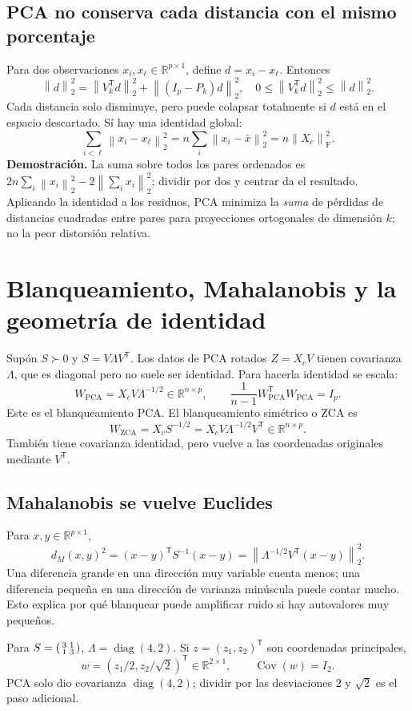 \documentclass[11pt,a4paper]{article}
\newcommand{\R}{\mathbb R}
\newcommand{\T}{^{\mathsf T}}
\newcommand{\norm}[1]{\left\lVert #1\right\rVert}
\DeclareMathOperator{\Cov}{Cov}
\DeclareMathOperator{\diag}{diag}
\newcommand{\F}{_{\mathrm F}}
\theoremstyle{definition}
\begin{document}
\subsection{PCA no conserva cada distancia con el mismo porcentaje}
Para dos observaciones $x_i,x_\ell\in\R^{p\times1}$, define $d=x_i-x_\ell$. Entonces
\[
\norm d_2^2=\norm{V_k\T d}_2^2+\norm{(I_p-P_k)d}_2^2,
\quad 0\le\norm{V_k\T d}_2^2\le\norm d_2^2.
\]
Cada distancia solo disminuye, pero puede colapsar totalmente si $d$ está en el espacio descartado. Sí hay una identidad global:
\[
\sum_{i<\ell}\norm{x_i-x_\ell}_2^2=n\sum_i\norm{x_i-\bar x}_2^2=n\norm{X_c}\F^2.
\]
\textbf{Demostración.} La suma sobre todos los pares ordenados es $2n\sum_i\norm{x_i}_2^2-2\norm{\sum_ix_i}_2^2$; dividir por dos y centrar da el resultado. Aplicando la identidad a los residuos, PCA minimiza la \emph{suma} de pérdidas de distancias cuadradas entre pares para proyecciones ortogonales de dimensión $k$; no la peor distorsión relativa.

\section{Blanqueamiento, Mahalanobis y la geometría de identidad}
Supón $S\succ0$ y $S=V\Lambda V\T$. Los datos de PCA rotados $Z=X_cV$ tienen covarianza $\Lambda$, que es diagonal pero no suele ser identidad. Para hacerla identidad se escala:
\[
W_{\mathrm{PCA}}=X_cV\Lambda^{-1/2}\in\R^{n\times p},\qquad
\frac1{n-1}W_{\mathrm{PCA}}\T W_{\mathrm{PCA}}=I_p.
\]
Este es el blanqueamiento PCA. El blanqueamiento simétrico o ZCA es
\[
W_{\mathrm{ZCA}}=X_cS^{-1/2}=X_cV\Lambda^{-1/2}V\T\in\R^{n\times p}.
\]
También tiene covarianza identidad, pero vuelve a las coordenadas originales mediante $V\T$.
\subsection{Mahalanobis se vuelve Euclides}
Para $x,y\in\R^{p\times1}$,
\[
d_M(x,y)^2=(x-y)\T S^{-1}(x-y)
=\norm{\Lambda^{-1/2}V\T(x-y)}_2^2.
\]
Una diferencia grande en una dirección muy variable cuenta menos; una diferencia pequeña en una dirección de varianza minúscula puede contar mucho. Esto explica por qué blanquear puede amplificar ruido si hay autovalores muy pequeños.
\begin{ejemplo}
Para $S=\begin{psmallmatrix}3&1\\1&3\end{psmallmatrix}$, $\Lambda=\diag(4,2)$. Si $z=(z_1,z_2)\T$ son coordenadas principales,
\[
w=(z_1/2,z_2/\sqrt2)\T\in\R^{2\times1},\qquad\Cov(w)=I_2.
\]
PCA solo dio covarianza $\diag(4,2)$; dividir por las desviaciones $2$ y $\sqrt2$ es el paso adicional.
\end{ejemplo}
\end{document}
